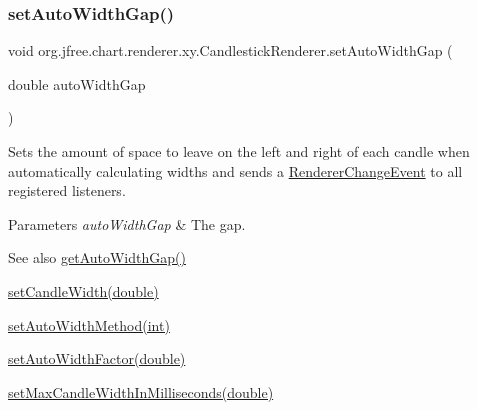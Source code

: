 \subsubsection{\texorpdfstring{set\+Auto\+Width\+Gap()}{setAutoWidthGap()}}
{\footnotesize\ttfamily void org.\+jfree.\+chart.\+renderer.\+xy.\+Candlestick\+Renderer.\+set\+Auto\+Width\+Gap (\begin{DoxyParamCaption}\item[{double}]{auto\+Width\+Gap }\end{DoxyParamCaption})}

Sets the amount of space to leave on the left and right of each candle when automatically calculating widths and sends a \mbox{\hyperlink{}{Renderer\+Change\+Event}} to all registered listeners.


\begin{DoxyParams}{Parameters}
{\em auto\+Width\+Gap} & The gap.\\
\hline
\end{DoxyParams}
\begin{DoxySeeAlso}{See also}
\mbox{\hyperlink{classorg_1_1jfree_1_1chart_1_1renderer_1_1xy_1_1_candlestick_renderer_a43a56602a325bb287cce2fa5bb40c1a1}{get\+Auto\+Width\+Gap()}} 

\mbox{\hyperlink{classorg_1_1jfree_1_1chart_1_1renderer_1_1xy_1_1_candlestick_renderer_a212b98d88bbc173df25fcafd7f983ff3}{set\+Candle\+Width(double)}} 

\mbox{\hyperlink{classorg_1_1jfree_1_1chart_1_1renderer_1_1xy_1_1_candlestick_renderer_a556f4cc791dcf82be3e4e82c6f82dd66}{set\+Auto\+Width\+Method(int)}} 

\mbox{\hyperlink{classorg_1_1jfree_1_1chart_1_1renderer_1_1xy_1_1_candlestick_renderer_a0189cacb382b9e002ad932e555a79664}{set\+Auto\+Width\+Factor(double)}} 

\mbox{\hyperlink{classorg_1_1jfree_1_1chart_1_1renderer_1_1xy_1_1_candlestick_renderer_a7f28bced2a25bf012d05127ac175af49}{set\+Max\+Candle\+Width\+In\+Milliseconds(double)}} 
\end{DoxySeeAlso}
\mbox{\label{classorg_1_1jfree_1_1chart_1_1renderer_1_1xy_1_1_candlestick_renderer_a556f4cc791dcf82be3e4e82c6f82dd66}} 
